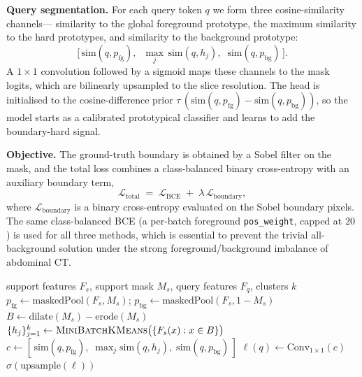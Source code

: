 \documentclass[conference]{IEEEtran}
\begin{document}
\textbf{Query segmentation.} For each query token $q$ we form three cosine-similarity channels---
similarity to the global foreground prototype, the maximum similarity to the hard prototypes, and
similarity to the background prototype:
\begin{equation}
  \big[\,\mathrm{sim}(q,p_{\text{fg}}),\;\; \max_{j}\,\mathrm{sim}(q,h_j),\;\; \mathrm{sim}(q,p_{\text{bg}})\,\big].
  \label{eq:channels}
\end{equation}
A $1{\times}1$ convolution followed by a sigmoid maps these channels to the mask logits, which are
bilinearly upsampled to the slice resolution. The head is initialised to the cosine-difference
prior $\tau\,(\mathrm{sim}(q,p_{\text{fg}})-\mathrm{sim}(q,p_{\text{bg}}))$, so the model starts as
a calibrated prototypical classifier and learns to add the boundary-hard signal.

\textbf{Objective.} The ground-truth boundary is obtained by a Sobel filter on the mask, and the
total loss combines a class-balanced binary cross-entropy with an auxiliary boundary term,
\begin{equation}
  \mathcal{L}_{\text{total}} \;=\; \mathcal{L}_{\text{BCE}} \;+\; \lambda\,\mathcal{L}_{\text{boundary}},
  \label{eq:total}
\end{equation}
where $\mathcal{L}_{\text{boundary}}$ is a binary cross-entropy evaluated on the Sobel boundary
pixels. The same class-balanced BCE (a per-batch foreground \texttt{pos\_weight}, capped at $20$) is
used for all three methods, which is essential to prevent the trivial all-background solution under
the strong foreground/background imbalance of abdominal CT.

\begin{algorithm}[t]
\caption{BE-HPG episode inference}
\label{alg:behpg}
\begin{algorithmic}[1]
\Require support features $F_s$, support mask $M_s$, query features $F_q$, clusters $k$
\State $p_{\text{fg}} \gets \mathrm{maskedPool}(F_s, M_s)$;\;\; $p_{\text{bg}} \gets \mathrm{maskedPool}(F_s, 1-M_s)$
\State $B \gets \mathrm{dilate}(M_s) - \mathrm{erode}(M_s)$ 
\State $\{h_j\}_{j=1}^{k} \gets \textsc{MiniBatchKMeans}\big(\{F_s(x): x\in B\}\big)$ 
  \State $c \gets [\,\mathrm{sim}(q,p_{\text{fg}}),\; \max_j \mathrm{sim}(q,h_j),\; \mathrm{sim}(q,p_{\text{bg}})\,]$
  \State $\ell(q) \gets \mathrm{Conv}_{1\times1}(c)$
\EndFor
\State \Return $\sigma(\mathrm{upsample}(\ell))$ 
\end{algorithmic}
\end{algorithm}
\end{document}
